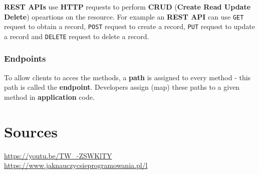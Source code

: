 \documentclass[11pt,a4paper]{article}
\begin{document}
\textbf{REST APIs} use \textbf{HTTP} requests to perform \textbf{CRUD} (\textbf{Create Read Update Delete}) opeartions on the resource. For example an \textbf{REST API} can use \texttt{GET} request to obtain a record, \texttt{POST} request to create a record, \texttt{PUT} request to update a record and \texttt{DELETE} request to delete a record.

\subsubsection{Endpoints}

To allow clients to acces the methods, a \textbf{path} is assigned to every method - this path is called the \textbf{endpoint}. Developers assign (map) these paths to a given method in \textbf{application} code.

\section{Sources}
\begin{scriptsize}
\url{https://youtu.be/TW_-ZSWKlTY}\\
\url{https://www.jaknauczycsieprogramowania.pl/l}
\end{scriptsize}
\end{document}
